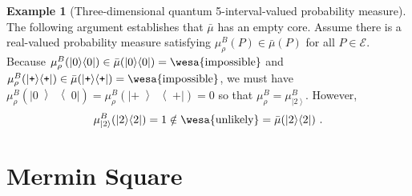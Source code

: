 \documentclass[12pt]{iopart}
\theoremstyle{plain}
\theoremstyle{definition}
\newtheorem{example}[thm]{Example}
\newcommand{\events}{\ensuremath{\mathcal{E}}}
\newcommand{\imposs}{{\mbox{\wesa{impossible}}}}
\newcommand{\unlikely}{{\mbox{\wesa{unlikely}}}}
\newcommand{\ket}[1]{{\left\vert{#1}\right\rangle}}
\newcommand{\op}[2]{\ensuremath{\left\vert{#1}\middle\rangle\middle\langle{#2}\right\vert}}
\newcommand{\proj}[1]{\op{#1}{#1}}
\newcommand{\ps}{\texttt{+}}
\begin{document}
\begin{example}[Three-dimensional quantum 5-interval-valued probability
measure]
The following argument establishes that $\bar{\mu}$ has an empty
core. Assume there is a real-valued probability measure satisfying
$\mu_{\rho}^{B}(P)\in\bar{\mu}(P)$ for all $P\in\events$. Because
$\mu_{\rho}^{B}(\proj{0})\in\bar{\mu}(\proj{0})=\imposs$ and $\mu_{\rho}^{B}(\proj{\ps})\in\bar{\mu}(\proj{\ps})=\imposs$,
we must have $\mu_{\rho}^{B}(\proj{0})=\mu_{\rho}^{B}(\proj{\ps})=0$
so that $\mu_{\rho}^{B}=\mu_{\ket{2}}^{B}$. However, 
\begin{equation}
\mu_{\ket{2}}^{B}(\proj{2})=1\notin\unlikely=\bar{\mu}(\proj{2})\textrm{ .}
\end{equation}
\end{example}



\section{Mermin Square\label{sec:MerminSquare}}
\end{document}
